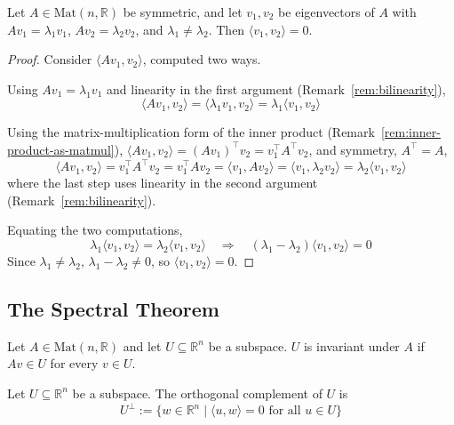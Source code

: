 		\begin{proposition}
			\label{prop:symmetric-eigenvectors-orthogonal}
			Let $A \in \mathrm{Mat}(n,\mathbb{R})$ be symmetric, and let $v_1, v_2$ be eigenvectors of $A$ with $Av_1 = \lambda_1 v_1$, $Av_2 = \lambda_2 v_2$, and $\lambda_1 \neq \lambda_2$. Then $\langle v_1, v_2 \rangle = 0$.
		\end{proposition}
		
		\begin{proof}
			Consider $\langle Av_1, v_2 \rangle$, computed two ways.
			
			Using $Av_1 = \lambda_1 v_1$ and linearity in the first argument (Remark~\ref{rem:bilinearity}),
			\[
				\langle Av_1, v_2 \rangle = \langle \lambda_1 v_1, v_2 \rangle = \lambda_1 \langle v_1, v_2 \rangle
			\]
			
			Using the matrix-multiplication form of the inner product (Remark~\ref{rem:inner-product-as-matmul}), $\langle Av_1,v_2\rangle = (Av_1)^\top v_2 = v_1^\top A^\top v_2$, and symmetry, $A^\top = A$,
			\[
				\langle Av_1, v_2 \rangle = v_1^\top A^\top v_2 = v_1^\top A v_2 = \langle v_1, Av_2 \rangle = \langle v_1, \lambda_2 v_2 \rangle = \lambda_2 \langle v_1, v_2 \rangle
			\]
			where the last step uses linearity in the second argument (Remark~\ref{rem:bilinearity}).
			
			Equating the two computations,
			\[
				\lambda_1 \langle v_1, v_2 \rangle = \lambda_2 \langle v_1, v_2 \rangle \quad\Longrightarrow\quad (\lambda_1 - \lambda_2)\langle v_1, v_2 \rangle = 0
			\]
			Since $\lambda_1 \neq \lambda_2$, $\lambda_1 - \lambda_2 \neq 0$, so $\langle v_1, v_2 \rangle = 0$.
		\end{proof}
		
	\subsection{The Spectral Theorem}
	\label{sec:spectral-theorem}
		
		\begin{definition}
			\label{def:invariant-subspace}
			Let $A \in \mathrm{Mat}(n,\mathbb{R})$ and let $U \subseteq \mathbb{R}^n$ be a subspace. $U$ is invariant under $A$ if $Av \in U$ for every $v \in U$.
		\end{definition}
		
		\begin{definition}
			\label{def:orthogonal-complement}
			Let $U \subseteq \mathbb{R}^n$ be a subspace. The orthogonal complement of $U$ is
			\[
				U^\perp := \{ w \in \mathbb{R}^n \mid \langle u, w \rangle = 0 \text{ for all } u \in U \}
			\]
		\end{definition}
		
